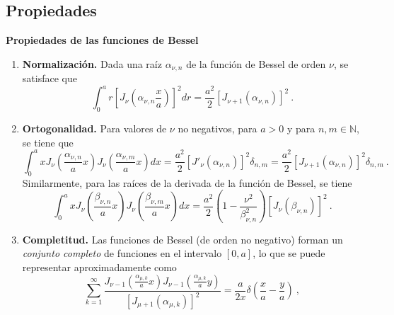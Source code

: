 \subsection{Propiedades}
\begin{propiedad}
    \textbf{Propiedades de las funciones de Bessel}

    \begin{enumerate}
        \item \textbf{Normalización.} Dada una raíz $\alpha_{\nu, n}$ de la función de Bessel de orden $\nu$, se satisface que
        \begin{equation}
            \int_0^a r \left[J_\nu\left( \alpha_{\nu, n} \frac{x}{a} \right)\right]^2 dr = \frac{a^2}{2} \left[ J_{\nu+1}(\alpha_{\nu, n}) \right]^2 \ . 
        \end{equation}
        \item \textbf{Ortogonalidad.} Para valores de $\nu$ no negativos, para $a > 0$ y para $n, m \in \mathbb{N}$, se tiene que
        \begin{equation}
            \int_0^a x J_{\nu} \left( \frac{\alpha_{\nu, n}}{a} x \right) J_\nu\left( \frac{\alpha_{\nu, m}}{a} x \right) dx = \frac{a^2}{2} [J'_\nu(\alpha_{\nu, n})]^2 \delta_{n, m} = \frac{a^2}{2} [J_{\nu+1}(\alpha_{\nu, n})]^2 \delta_{n, m} \ .
        \end{equation}
        Similarmente, para las raíces de la derivada de la función de Bessel, se tiene
        \begin{equation}
            \int_0^a x J_\nu\left(\frac{\beta_{\nu, n}}{a}x \right) J_\nu\left(\frac{\beta_{\nu, m}}{a}x \right) dx = \frac{a^2}{2} \left( 1 - \frac{\nu^2}{\beta^2_{\nu, n}} \right) \left[ J_\nu(\beta_{\nu, n}) \right]^2 \ .
        \end{equation}
        \item \textbf{Completitud.} Las funciones de Bessel (de orden no negativo) forman un \emph{conjunto completo} de funciones en el intervalo $[0,a]$, lo que se puede representar aproximadamente como \cite{Reimberg2015}
        \begin{equation}
            \sum_{k=1}^\infty \frac{J_{\nu-1} \left(\frac{ \alpha_{\mu, k}}{a}x \right) J_{\nu-1} \left(\frac{\alpha_{\mu, k}}{a} y \right)}{\left[J_{\mu+1}(\alpha_{\mu, k})\right]^2} = \frac{a}{2x} \delta\left( \frac{x}{a} - \frac{y}{a} \right) \ ,

\end{equation}
\end{enumerate}
\end{propiedad}

